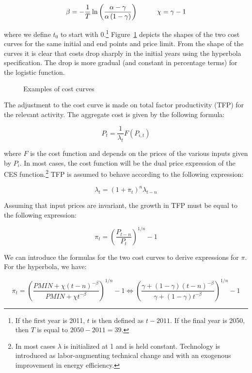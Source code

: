 \documentclass[11pt,letterpaper]{report}
\begin{document}
\[
\begin{array}{c c}
\beta = \displaystyle - \frac{1}{T} \ln \left( \displaystyle
   \frac{\alpha-\gamma}{\alpha\left(1-\gamma\right)}\right)
&  \qquad \chi = \gamma-1 \\
\end{array}
\]

\noindent where we define $t_0$ to start with 0.\footnote{If the first year is
2011, $t$ is then defined as $t-2011$. If 	the final year is 2050, then $T$ is
equal to $2050 - 2011=39$.} Figure~\ref{fig:costCurve} depicts the shapes of the
two cost curves for the same initial and end points and price limit. From the
shape of the curves it is clear that costs drop sharply in the initial years
using the hyperbola specification. The drop is more gradual (and constant in
percentage terms) for the logistic function.

\begin{figure}
   \centering
   
   \caption{Examples of cost curves}
   \label{fig:costCurve}
\end{figure}

The adjustment to the cost curve is made on total factor productivity (TFP) for
the relevant activity. The aggregate cost is given by the following formula:

\[
P_t = \frac{1}{\lambda_t} F(P_{i,t})
\]

\noindent where $F$ is the cost function and depends on the prices of the
various inputs given by $P_i$. In most cases, the cost function will be the dual
price expression of the CES function.\footnote{In 	most cases $\lambda$ is
initialized at 1 and is held constant. Technology is introduced as
labor-augmenting technical change and with an exogenous improvement in
energy efficiency.} TFP is assumed to behave according to the following
expression:

\[
\lambda_t = \left(1+\pi_t\right)^n \lambda_{t-n}
\]

Assuming that input prices are invariant, the growth in TFP must be equal to the
following expression:

\[
\pi_t = \left( \frac{P_{t-n}}{P_t} \right)^{1/n} -1
\]

We can introduce the formulas for the two cost curves to derive expressions for
$\pi$. For the hyperbola, we have:

\[
\pi_t =
   \left( \frac{\mathit{PMIN}+\chi(t-n)^{-\beta}}
      {\mathit{PMIN}+\chi t^{-\beta}} \right)^{1/n} -1
\Longleftrightarrow
   \left( \frac{\gamma + (1-\gamma)(t-n)^{-\beta}}
      {\gamma + (1-\gamma) t^{-\beta}} \right)^{1/n} -1
\]
\end{document}
